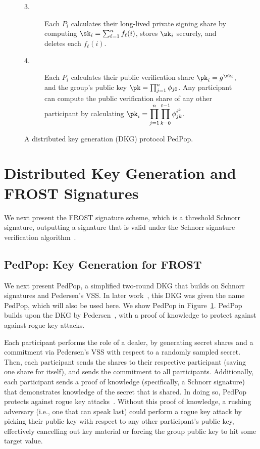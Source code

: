 \begin{figure}[!ht]
\begin{framed}
\begin{flushleft}
\begin{description}
      \item[3.] Each $P_i$ calculates their long-lived private
        signing share by computing $\sk_i = \sum_{\ell=1}^n f_\ell(i)$, stores
        $\sk_i$ securely, and deletes each $f_\ell(i)$.
      \item[4.] Each $P_i$ calculates their public verification
        share $\pk_i = g^{\sk_i}$, and the group's public key
        $\pk = \prod_{j=1}^n \phi_{j0}$.
        Any participant can compute the public verification share of
        any other participant by calculating
        \( \displaystyle
        \pk_i = \prod_{j=1}^n \prod_{k=0}^{t-1} \phi_{jk}^{i^k }
        \).

    \end{description}
    \end{flushleft}
  \end{framed}
    \caption{A distributed
    key generation (DKG) protocol PedPop.
    }
  \label{fg:pedpop}
\end{figure}



\section{Distributed Key Generation and FROST Signatures}

We next present the FROST signature scheme,
which is a threshold Schnorr signature,
outputting a signature that is valid under the Schnorr signature verification
algorithm~\cite{Schnorr91}.

\subsection{PedPop: Key Generation for FROST}

We next present PedPop,
a simplified two-round DKG that builds on Schnorr signatures and Pedersen's VSS.
In later work~\cite{BellareCKMTZ22},
this DKG was given the name PedPop,
which will also be used here.
%
We show PedPop in Figure~\ref{fg:pedpop}.
PedPop builds upon the DKG by Pedersen~\cite{Pedersen91},
with a proof of knowledge to protect against against rogue key attacks.

Each participant performs the role of a dealer,
by generating secret shares and a commitment via Pedersen's VSS
with respect to a randomly sampled secret.
Then,
each participant sends the shares to their respective participant (saving one
share for itself),
and sends the commitment to all participants.
Additionally,
each participant sends a proof of knowledge (specifically, a
Schnorr signature) that demonstrates knowledge of the secret that is shared. In
doing so, PedPop  protects against rogue key attacks~\cite{RistenpartY07}.
Without this proof of knowledge,
a rushing adversary (i.e., one that can speak last) could perform a rogue key
attack by picking  their public key with respect to any other participant's public key,
effectively cancelling out key material or forcing the group public key to hit some target
value.

